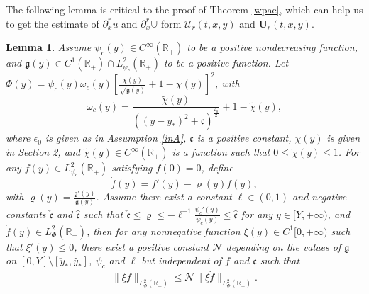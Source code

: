 \documentclass{amsart}
\numberwithin{equation}{section}
\newtheorem{lemma}{Lemma}[section]
\begin{document}
The following lemma is critical to the proof of Theorem \ref{wpae}, which can help us to get the estimate of $\partial_{x}^{r}u$ and $\partial_{x}^{r}\mathbb{U}$ form $\mathcal{U}_{r}(t,x,y)$ and $\mathbf{U}_{r}(t,x,y)$.
\begin{lemma}\label{nc}
Assume $\psi_{c}(y)\in C^{\infty}(\mathbb{R}_{+})$ to be a positive nondecreasing function,
and $\mathfrak{g}(y)\in C^{1}(\mathbb{R}_{+})\cap L_{\psi_{c}}^{2}(\mathbb{R}_{+})$ to be a positive function.
Let $\Phi(y)=\psi_{c}(y)\omega_{c}(y)\left[\frac{\chi(y)}{\sqrt{\mathfrak{g}(y)}}+1-\chi(y)\right]^{2}$, with
$$\omega_{c}(y)=\frac{\tilde{\chi}(y)}{((y-y_{*})^{2}+\mathfrak{c})^{\frac{\varepsilon_{0}}{2}}}+1-\tilde{\chi}(y),$$
where $\epsilon_{0}$ is given as in Assumption \ref{inA}, $\mathfrak{c}$ is a positive constant, $\chi(y)$ is given in Section 2, and $\tilde{\chi}(y)\in C^{\infty}(\mathbb{R}_{+})$ is a function such that
$0\leq\tilde{\chi}(y)\leq 1$.
For any $f(y)\in L_{\psi_{c}}^{2}(\mathbb{R}_{+})$ satisfying $f(0)=0$, define $$\dot{f}(y)=f'(y)-\varrho(y)f(y),$$
with $\varrho(y)=\frac{\mathfrak{g}'(y)}{\mathfrak{g}(y)}$.
Assume there exist a constant $\ell\in(0,1)$ and negative constants $\check{\mathfrak{c}}$ and $\hat{\mathfrak{c}}$ such that
 $\check{\mathfrak{c}}\leq\varrho\leq -\ell^{-1}\frac{\psi_{c}'(y)}{\psi_{c}(y)}\leq\hat{\mathfrak{c}}$ for any $y\in[Y,+\infty)$,
and $\dot{f}(y)\in L_{\Phi}^{2}(\mathbb{R}_{+})$,
then for any nonnegative function $\xi(y)\in C^{1}[0,+\infty)$ such that $\xi'(y)\leq0$,
there exist a positive constant $\mathcal{N}$ depending on the values of $\mathfrak{g}$ on $[0,Y]\setminus[\check{y}_{*},\hat{y}_{*}]$, $\psi_{c}$ and $\ell$ but independent of $f$ and $\mathfrak{c}$ such that
\begin{align}\label{nce0}
\|\xi f\|_{L_{\Phi}^{2}(\mathbb{R}_{+})}\leq \mathcal{N}\|\xi\dot{f}\|_{L_{\Phi}^{2}(\mathbb{R}_{+})}.
\end{align}
\end{lemma}
\end{document}
